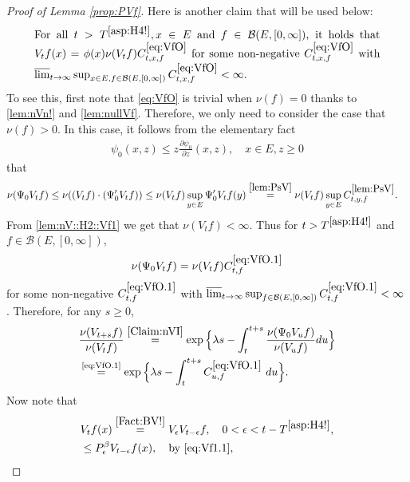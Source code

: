 \documentclass[12pt,a4paper]{amsart}
\numberwithin{equation}{section}
\theoremstyle{plain}
\theoremstyle{definition}
\theoremstyle{remark}
\begin{document}
\begin{proof}[Proof of Lemma \ref{prop:PVf}]
	
	Here is another claim that will be used below:
\begin{equation}
\begin{minipage}{0.9\textwidth}
	For all $t> T^{\eqref{asp:H4!}}, x\in E$ and $f\in \mathcal B(E,[0,\infty])$, it holds that $V_t f(x) = \phi(x) \nu(V_tf) C^{\eqref{eq:VfO}}_{t,x,f}$ for some non-negative $C^{\eqref{eq:VfO}}_{t,x,f}$ with $\varlimsup_{t\to \infty} \sup_{x\in E, f\in \mathcal B(E,[0,\infty])} C^{\eqref{eq:VfO}}_{t,x,f} <\infty$.
\end{minipage} \label{eq:VfO}
\end{equation}
	To see this, first note that \eqref{eq:VfO} is trivial when $\nu(f) = 0$ thanks to \eqref{lem:nVn!} and \eqref{lem:nullVf}.
	Therefore, we only need to consider the case that $\nu(f)>0$.
	In this case, it follows from the elementary fact
\begin{align}\label{e:derofpsi0}
	\psi_0(x,z)
	\leq z \frac{\partial \psi_0}{\partial z}(x,z),
	\quad x\in E, z\geq 0
\end{align}
	that
\begin{align}
	&\nu(\Psi_0 V_tf)
	\leq \nu((V_tf)\cdot (\Psi_0' V_tf)) \leq \nu(V_tf) \sup_{y\in E} \Psi_0' V_tf(y)
	\overset{\eqref{lem:PsV}}= \nu(V_tf) \sup_{y\in E} C^{\eqref{lem:PsV}}_{t,y,f}.
\end{align}
	From \eqref{lem:nV::H2::Vf1}  we get that $\nu(V_tf) <\infty$.
	Thus for $t> T^{\eqref{asp:H4!}}$ and $f\in \mathcal B(E,[0,\infty])$,
\begin{equation}
	\nu(\Psi_0 V_t f)  = \nu(V_tf) C^{\eqref{eq:VfO.1}}_{t,f} \label{eq:VfO.1}
\end{equation}
	for some non-negative $C^{\eqref{eq:VfO.1}}_{t,f} $ with $\varlimsup_{t\to \infty} \sup_{f\in \mathcal B(E,[0,\infty])}C^{\eqref{eq:VfO.1}}_{t,f}  < \infty$.
	Therefore, for any $s\geq 0$,
\begin{align}
	&  \frac{\nu(V_{t+s} f)} {\nu(V_t f)} \overset{\eqref{Claim:nVI}}= \exp\Big\{ \lambda s - \int_t^{t+s} \frac{\nu(\Psi_0 V_u f) }{\nu(V_u f)} du\Big\}
	\\&\label{eq:VfO.2} \overset{\text{\eqref{eq:VfO.1}}}= \exp\Big\{ \lambda s - \int_t^{t+s} C^{\eqref{eq:VfO.1}}_{u,f} ~du\Big\}.
\end{align}
	Now note that
\begin{align}
	&V_{t}f(x) \overset{\eqref{Fact:BV!}}= V_{\epsilon} V_{t-\epsilon} f , \quad 0<\epsilon < t- T^{\eqref{asp:H4!}} ,
	\\&\leq P_\epsilon^\beta V_{t-\epsilon} f(x),\quad\text{by \eqref{eq:Vf1.1}},

\end{align}
\end{proof}
\end{document}
